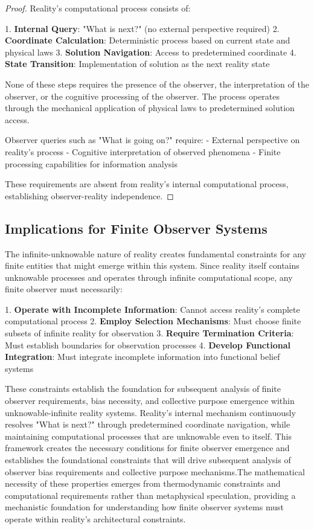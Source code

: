 \documentclass[12pt,a4paper]{article}
\begin{document}
\begin{proof}
Reality's computational process consists of:

1. \textbf{Internal Query}: "What is next?" (no external perspective required)
2. \textbf{Coordinate Calculation}: Deterministic process based on current state and physical laws
3. \textbf{Solution Navigation}: Access to predetermined coordinate
4. \textbf{State Transition}: Implementation of solution as the next reality state

None of these steps requires the presence of the observer, the interpretation of the observer, or the cognitive processing of the observer. The process operates through the mechanical application of physical laws to predetermined solution access.

Observer queries such as "What is going on?" require:
- External perspective on reality's process
- Cognitive interpretation of observed phenomena  
- Finite processing capabilities for information analysis

These requirements are absent from reality's internal computational process, establishing observer-reality independence.
\end{proof}

\subsection{Implications for Finite Observer Systems}

The infinite-unknowable nature of reality creates fundamental constraints for any finite entities that might emerge within this system. Since reality itself contains unknowable processes and operates through infinite computational scope, any finite observer must necessarily:

1. \textbf{Operate with Incomplete Information}: Cannot access reality's complete computational process
2. \textbf{Employ Selection Mechanisms}: Must choose finite subsets of infinite reality for observation
3. \textbf{Require Termination Criteria}: Must establish boundaries for observation processes
4. \textbf{Develop Functional Integration}: Must integrate incomplete information into functional belief systems

These constraints establish the foundation for subsequent analysis of finite observer requirements, bias necessity, and collective purpose emergence within unknowable-infinite reality systems. Reality's internal mechanism continuously resolves "What is next?" through predetermined coordinate navigation, while maintaining computational processes that are unknowable even to itself. This framework creates the necessary conditions for finite observer emergence and establishes the foundational constraints that will drive subsequent analysis of observer bias requirements and collective purpose mechanisms.The mathematical necessity of these properties emerges from thermodynamic constraints and computational requirements rather than metaphysical speculation, providing a mechanistic foundation for understanding how finite observer systems must operate within reality's architectural constraints.
\end{document}
